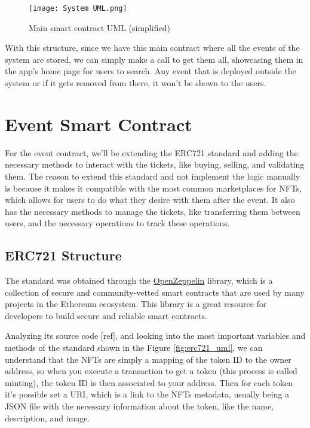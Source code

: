 \begin{figure}[H]
	\texttt{[image: System UML.png]}
	\centering
	\caption{Main smart contract UML (simplified)}
	\label{fig:system_uml}
\end{figure}

With this structure, since we have this main contract where all the events of
the system are stored, we can simply make a call to get them all, showcasing
them in the app's home page for users to search. Any event that is deployed
outside the system or if it gets removed from there, it won't be shown to the
users.

\section{Event Smart Contract}
\label{sec:event_smart_contract}

For the event contract, we'll be extending the ERC721 standard and adding the
necessary methods to interact with the tickets, like buying, selling, and
validating them. The reason to extend this standard and not implement the logic
manually is because it makes it compatible with the most common marketplaces
for NFTs, which allows for users to do what they desire with them after the
event. It also has the necessary methods to manage the tickets, like
transferring them between users, and the necessary operations to track these
operations.

\subsection{ERC721 Structure}
\label{subsec:erc721_structure}

The standard was obtained through the
\href{https://docs.openzeppelin.com/contracts/api/token/erc721#ERC721}{OpenZeppelin}
library, which is a collection of secure and community-vetted smart contracts
that are used by many projects in the Ethereum ecosystem. This library is a
great resource for developers to build secure and reliable smart contracts.

Analyzing its source code [ref], and looking into the most important variables
and methods of the standard shown in the Figure \ref{fig:erc721_uml}, we can
understand that the NFTs are simply a mapping of the token ID to the owner
address, so when you execute a transaction to get a token (this process is
called minting), the token ID is then associated to your address. Then for each
token it's possible set a URI, which is a link to the NFTs metadata, usually
being a JSON file with the necessary information about the token, like the
name, description, and image.

